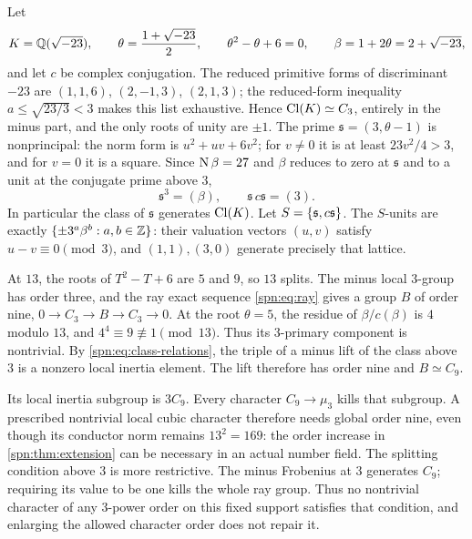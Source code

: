 Let
\[
 K=\mathbb{Q}(\sqrt{-23}),\qquad\theta=\frac{1+\sqrt{-23}}2,\qquad
 \theta^2-\theta+6=0,\qquad\beta=1+2\theta=2+\sqrt{-23},
\]
and let $c$ be complex conjugation. The reduced primitive forms of
discriminant $-23$ are $(1,1,6)$, $(2,-1,3)$, $(2,1,3)$; the reduced-form
inequality $a\le\sqrt{23/3}<3$ makes this list exhaustive. Hence
$\operatorname{Cl}(K)\simeq C_3$, entirely in the minus part, and the only roots of unity
are $\pm1$. The prime $\mathfrak s=(3,\theta-1)$ is nonprincipal: the norm
form is $u^2+uv+6v^2$; for $v\ne0$ it is at least $23v^2/4>3$, and for $v=0$
it is a square. Since $\operatorname{N}\beta=27$ and $\beta$ reduces to zero at
$\mathfrak s$ and to a unit at the conjugate prime above $3$,
\begin{equation}\label{spn:eq:class-relations}
 \mathfrak s^3=(\beta),\qquad\mathfrak s\,c\mathfrak s=(3).
\end{equation}
In particular the class of $\mathfrak s$ generates $\operatorname{Cl}(K)$. Let
$S=\{\mathfrak s,c\mathfrak s\}$. The $S$-units are exactly
$\{\pm3^a\beta^b:a,b\in\mathbb{Z}\}$: their valuation vectors $(u,v)$ satisfy
$u-v\equiv0\pmod3$, and $(1,1),(3,0)$ generate precisely that lattice.

\begin{example}\label{spn:ex:conductor13}
At $13$, the roots of $T^2-T+6$ are $5$ and $9$, so $13$ splits. The minus
local $3$-group has order three, and the ray exact sequence \eqref{spn:eq:ray}
gives a group $B$ of order nine,
$0\to C_3\to B\to C_3\to0$. At the root $\theta=5$, the residue of
$\beta/c(\beta)$ is $4$ modulo $13$, and $4^4\equiv9\not\equiv1\pmod{13}$.
Thus its $3$-primary component is nontrivial. By
\eqref{spn:eq:class-relations}, the triple of a minus lift of the class above
$3$ is a nonzero local inertia element. The lift therefore has order nine and
$B\simeq C_9$.

Its local inertia subgroup is $3C_9$. Every character $C_9\to\mu_3$ kills
that subgroup. A prescribed nontrivial local cubic character therefore needs
global order nine, even though its conductor norm remains $13^2=169$: the
order increase in \cref{spn:thm:extension} can be necessary in an actual
number field. The splitting condition above $3$ is more restrictive. The
minus Frobenius at $3$ generates $C_9$; requiring its value to be one kills
the whole ray group. Thus no nontrivial character of any $3$-power order on
this fixed support satisfies that condition, and enlarging the allowed
character order does not repair it.
\end{example}


